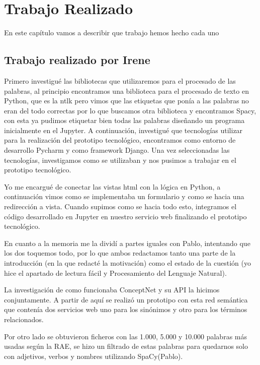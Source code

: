 \chapter{Trabajo Realizado}
\label{cap:TrabajoRealizado}


En este capítulo vamos a describir que trabajo hemos hecho cada uno


\section{Trabajo realizado por Irene}
\label{cap:sec:trabajo_Irene}

Primero investigué las bibliotecas que utilizaremos para el procesado de las palabras, al principio encontramos una biblioteca para el procesado de texto en Python, que es la ntlk pero vimos que las etiquetas que ponía a las palabras no eran del todo correctas por lo que buscamos otra biblioteca y encontramos Spacy, con esta ya pudimos etiquetar bien todas las palabras diseñando un programa inicialmente en el Jupyter. A continuación, investigué que tecnologías utilizar para la realización del prototipo tecnológico, encontramos como entorno de desarrollo Pycharm y como framework Django. Una vez seleccionadas las tecnologías, investigamos como se utilizaban y nos pusimos a trabajar en el prototipo tecnológico.

Yo me encargué de conectar las vistas html con la lógica en Python, a continuación vimos como se implementaba un formulario y como se hacia una redirección a vista. Cuando supimos como se hacia todo esto, integramos el código desarrollado en Jupyter en nuestro servicio web finalizando el prototipo tecnológico. \newline

En cuanto a la memoria me la dividí a partes iguales con Pablo, intentando que los dos toquemos todo, por lo que ambos redactamos tanto una parte de la introducción (en la que redacté la motivación) como el estado de la cuestión (yo hice el apartado de lectura fácil y Procesamiento del Lenguaje Natural). \newline

La investigación de como funcionaba ConceptNet y su API la hicimos conjuntamente. A partir de aquí se realizó un prototipo con esta red semántica que contenía dos servicios web uno para los sinónimos y otro para los términos relacionados. 

Por otro lado se obtuvieron ficheros con las 1.000, 5.000 y 10.000 palabras más usadas según la RAE, se hizo un filtrado de estas palabras para quedarnos solo con adjetivos, verbos y nombres utilizando SpaCy(Pablo).

